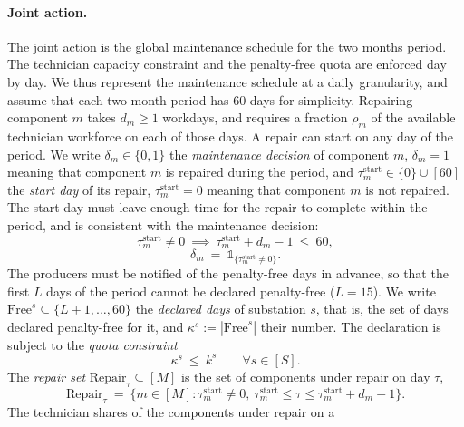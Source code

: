 \documentclass{article}
\begin{document}
\paragraph{Joint action.} The joint action is the global maintenance schedule for the two months period. The technician capacity constraint and the penalty-free quota are enforced day by day. We
thus represent the maintenance schedule at a daily granularity, and assume that each two-month period has 60 days for
simplicity. Repairing component $m$ takes $d_m \ge 1$ workdays, and requires a fraction $\rho_m$ of the available technician workforce on
each of those days. A repair can start on any day of the period. We write $\delta_m \in \{0,1\}$ the \emph{maintenance decision} of component $m$, $\delta_m = 1$ meaning that
component $m$ is repaired during the period, and $\tau^{\text{start}}_m \in \{0\} \cup [60]$ the
\emph{start day} of its repair, $\tau^{\text{start}}_m = 0$ meaning that component $m$ is not repaired. The start day
must leave enough time for the repair to complete within the period, and is consistent with the maintenance decision:
\begin{equation}
\label{eq:intro-start-feasible}
\tau^{\text{start}}_m \neq 0 \ \implies\ \tau^{\text{start}}_m + d_m - 1 \ \le\ 60,
\end{equation}
\begin{equation}
\label{eq:intro-am-link}
\delta_m \ =\ \mathds{1}_{\{\tau^{\text{start}}_m \neq 0\} }.
\end{equation}
The producers must be notified of the penalty-free days in advance, so that the first $L$ days of the period cannot
be declared penalty-free ($L = 15$). We write $\text{Free}^s \subseteq \{L+1, \ldots, 60\}$ the \emph{declared days} of substation $s$, that is, the set of days declared penalty-free for it, and $\kappa^s := |\text{Free}^s|$ their number. The declaration is
subject to the \emph{quota constraint}
\begin{equation}
\label{eq:intro-quota-constraint}
\kappa^s \ \le\ k^s \qquad \forall s \in [S].
\end{equation}
The \emph{repair set} $\text{Repair}_\tau \subseteq [M]$ is the set of
components under repair on day $\tau$,
\begin{equation}
\label{eq:intro-repair}
\text{Repair}_\tau \ =\ \big\{ m \in [M] : \tau^{\text{start}}_m \neq 0,\ \tau^{\text{start}}_m \le \tau
\le \tau^{\text{start}}_m + d_m - 1 \big\}.
\end{equation}
The technician shares of the components under repair on a
\end{document}
